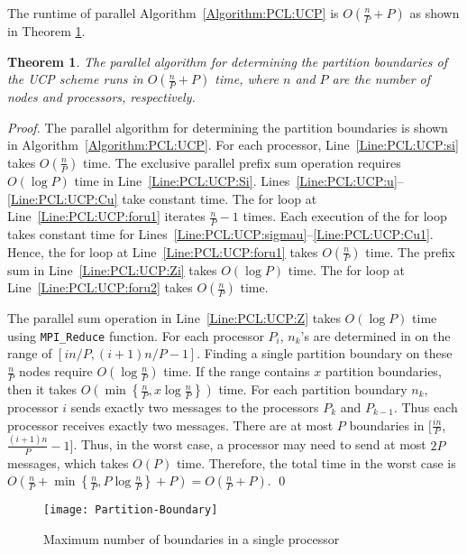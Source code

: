 \documentclass[conference,letterpaper,10pt]{IEEEtran}
\newtheorem{theorem}{Theorem}
\begin{document}
The runtime of parallel Algorithm~\ref{Algorithm:PCL:UCP}  is $O(\frac{n}{P}+P)$ as shown in Theorem \ref{thm:ucptime}.

\begin{theorem} \label{thm:ucptime}
The parallel algorithm for determining the partition boundaries of the UCP scheme runs in $O(\frac{n}{P}+P)$ time, where $n$ and $P$ are the number of nodes and processors, respectively.
\end{theorem}
\begin{proof}
The parallel algorithm for determining the partition boundaries is shown in  Algorithm~\ref{Algorithm:PCL:UCP}. 
For each processor, Line~\ref{Line:PCL:UCP:si} takes $O(\frac{n}{P})$ time. The exclusive parallel prefix sum operation requires $O(\log P)$ time in Line~\ref{Line:PCL:UCP:Si}. Lines~\ref{Line:PCL:UCP:u}--\ref{Line:PCL:UCP:Cu} take constant time. The for loop at Line~\ref{Line:PCL:UCP:foru1} iterates $\frac{n}{P}-1$ times. Each execution of the for loop takes constant time for Lines~\ref{Line:PCL:UCP:sigmau}--\ref{Line:PCL:UCP:Cu1}. Hence, the for loop at Line~\ref{Line:PCL:UCP:foru1} takes $O(\frac{n}{P})$ time. The prefix sum in Line~\ref{Line:PCL:UCP:Zi} takes $O(\log P)$ time. The for loop at Line~\ref{Line:PCL:UCP:foru2} takes $O(\frac{n}{P})$ time.

The parallel sum operation in Line~\ref{Line:PCL:UCP:Z} takes $O(\log P)$ time using \texttt{MPI\_Reduce} function.
For each processor $P_{i}$, $n_{k}$'s are determined in  on the range of $\left[{in}/{P},{(i+1)n}/{P}-1\right]$. Finding a single partition boundary on these $\frac{n}{P}$ nodes require $O(\log{\frac{n}{P}})$ time.
If the range contains $x$ partition boundaries, then it takes  $O(\min \left\{\frac{n}{P},x\log{\frac{n}{P}}\right\})$ time.
For each partition boundary $n_{k}$, processor $i$ sends exactly two messages to the processors $P_k$ and $P_{k-1}$. Thus each processor receives exactly two messages. There are at most $P$ boundaries in $[\frac{in}{P}$, $\frac{(i+1)n}{P}-1]$. Thus, in the worst case, a processor may need to send at most $2P$ messages, which takes $O(P)$ time. Therefore, the total time in the worst case is $O(\frac{n}{P}+\min \left\{\frac{n}{P},P\log{\frac{n}{P}}\right\}+ P)=O(\frac{n}{P}+P)$.
\qed
\end{proof}

\begin{figure}[b]
\centering
{\texttt{[image: Partition-Boundary]}}
\caption{Maximum number of boundaries in a single processor}
\label{Figure:PCL:FirstBlock}
\end{figure}
\end{document}
